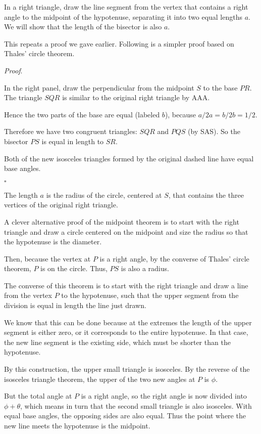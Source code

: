 \documentclass[11pt, oneside]{article}
\begin{document}
In a right triangle, draw the line segment from the vertex that contains a right angle to the midpoint of the hypotenuse, separating it into two equal lengths $a$.  We will show that the length of the bisector is also $a$.

This repeats a proof we gave earlier.  Following is a simpler proof based on Thales' circle theorem.

\emph{Proof}.

In the right panel, draw the perpendicular from the midpoint $S$ to the base $PR$.  The triangle $SQR$ is similar to the original right triangle by AAA.

Hence the two parts of the base are equal (labeled $b$), because $a/2a = b/2b = 1/2$.  

Therefore we have two congruent triangles:  $SQR$ and $PQS$ (by SAS).  So the bisector $PS$ is equal in length to $SR$.

Both of the new isosceles triangles formed by the original dashed line have equal base angles.

$\square$

The length $a$ is the radius of the circle, centered at $S$, that contains the three vertices of the original right triangle.

A clever alternative proof of the midpoint theorem is to start with the right triangle and draw a circle centered on the midpoint and size the radius so that the hypotenuse is the diameter.  

Then, because the vertex at $P$ is a right angle, by the converse of Thales' circle theorem, $P$ is on the circle.  Thus, $PS$ is also a radius.

The converse of this theorem is to start with the right triangle and draw a line from the vertex $P$ to the hypotenuse, such that the upper segment from the division is equal in length the line just drawn.  

We know that this can be done because at the extremes the length of the upper segment is either zero, or it corresponds to the entire hypotenuse.  In that case, the new line segment is the existing side, which must be shorter than the hypotenuse.  

By this construction, the upper small triangle is isosceles.  By the reverse of the isosceles triangle theorem, the upper of the two new angles at $P$ is $\phi$. 

But the total angle at $P$ is a right angle, so the right angle is now divided into $\phi + \theta$, which means in turn that the second small triangle is also isosceles.  With equal base angles, the opposing sides are also equal.  Thus the point where the new line meets the hypotenuse is the midpoint.
\end{document}
